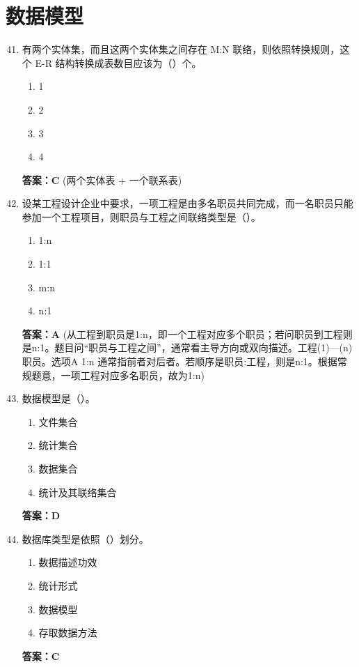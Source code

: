\documentclass[12pt, a4paper]{article}
\begin{document}
\section{数据模型}

\begin{enumerate}[label=\arabic*.]
    \setcounter{enumi}{40}
    \item 有两个实体集，而且这两个实体集之间存在 M:N 联络，则依照转换规则，这个 E-R 结构转换成表数目应该为（\quad）个。
    \begin{enumerate}
        \item 1
        \item 2
        \item 3
        \item 4
    \end{enumerate}
    \textbf{答案：C} (两个实体表 + 一个联系表)

    \item 设某工程设计企业中要求，一项工程是由多名职员共同完成，而一名职员只能参加一个工程项目，则职员与工程之间联络类型是（\quad）。
    \begin{enumerate}
        \item 1:n
        \item 1:1
        \item m:n
        \item n:1
    \end{enumerate}
    \textbf{答案：A} (从工程到职员是1:n，即一个工程对应多个职员；若问职员到工程则是n:1。题目问“职员与工程之间”，通常看主导方向或双向描述。工程(1)---(n)职员。选项A 1:n 通常指前者对后者。若顺序是职员:工程，则是n:1。根据常规题意，一项工程对应多名职员，故为1:n)

    \item 数据模型是（\quad）。
    \begin{enumerate}
        \item 文件集合
        \item 统计集合
        \item 数据集合
        \item 统计及其联络集合
    \end{enumerate}
    \textbf{答案：D}

    \item 数据库类型是依照（\quad）划分。
    \begin{enumerate}
        \item 数据描述功效
        \item 统计形式
        \item 数据模型
        \item 存取数据方法
    \end{enumerate}
    \textbf{答案：C}


\end{enumerate}
\end{document}
